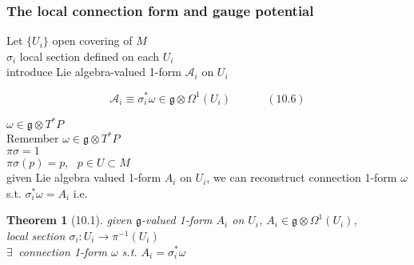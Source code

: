 \documentclass[twoside]{amsart}
\newtheorem{theorem}{Theorem}
\begin{document}
\subsubsection{}

\subsubsection{}

\subsubsection{ The local connection form and gauge potential }

Let $\lbrace U_i \rbrace$ open covering of $M$ \\
\phantom{ Let } $\sigma_i$ local section defined on each $U_i$   \\ 

introduce Lie algebra-valued 1-form $\mathcal{A}_i$ on $U_i$

\begin{equation}
  \mathcal{A}_i \equiv \sigma_i^* \omega \in \mathfrak{g} \otimes \Omega^1(U_i) \quad \quad \quad \, (10.6)
\end{equation}


$\omega \in \mathfrak{g} \otimes T^*P$ \\

Remember $\omega \in \mathfrak{g} \otimes T^*P$ \\
\phantom{Remember } $\pi \sigma = 1$ \\
\phantom{Remember } $\pi \sigma(p) = p$, \, $p \in U \subset M$ \\

given Lie algebra valued 1-form $A_i$ on $U_i$, we can reconstruct connection 1-form $\omega$ s.t. $\sigma_i^* \omega = A_i$ i.e.

\begin{theorem}[10.1]
  given $\mathfrak{g}$-valued 1-form $A_i$ on $U_i$, $A_i \in \mathfrak{g} \otimes \Omega^1(U_i)$, \\
\phantom{given} local section $\sigma_i:U_i \to \pi^{-1}(U_i)$ \\

$\exists \, $ connection 1-form $\omega$ s.t. $A_i = \sigma_i^* \omega$

\end{theorem}
\end{document}
